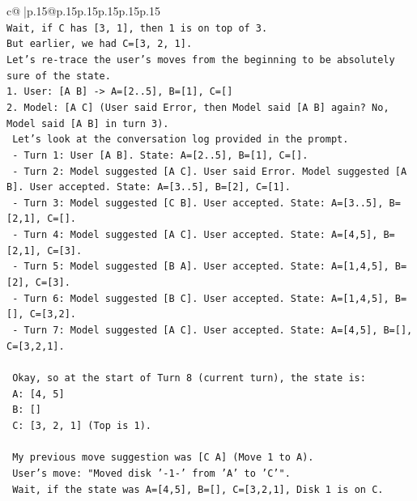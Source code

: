 \documentclass{article}
\begin{document}
{\begin{supertabular}{c@{$\;$}|p{.15\linewidth}@{}p{.15\linewidth}p{.15\linewidth}p{.15\linewidth}p{.15\linewidth}p{.15\linewidth}}
{{{\\ 
\texttt{Wait, if C has {[}3, 1{]}, then 1 is on top of 3.} \\
\texttt{But earlier, we had C={[}3, 2, 1{]}.} \\
\texttt{Let's re{-}trace the user's moves from the beginning to be absolutely sure of the state.} \\
\texttt{1. User: {[}A B{]} {-}> A={[}2..5{]}, B={[}1{]}, C={[}{]}} \\
\texttt{2. Model: {[}A C{]} (User said Error, then Model said {[}A B{]} again? No, Model said {[}A B{]} in turn 3).} \\
\texttt{   Let's look at the conversation log provided in the prompt.} \\
\texttt{   {-} Turn 1: User {[}A B{]}. State: A={[}2..5{]}, B={[}1{]}, C={[}{]}.} \\
\texttt{   {-} Turn 2: Model suggested {[}A C{]}. User said Error. Model suggested {[}A B{]}. User accepted. State: A={[}3..5{]}, B={[}2{]}, C={[}1{]}.} \\
\texttt{   {-} Turn 3: Model suggested {[}C B{]}. User accepted. State: A={[}3..5{]}, B={[}2,1{]}, C={[}{]}.} \\
\texttt{   {-} Turn 4: Model suggested {[}A C{]}. User accepted. State: A={[}4,5{]}, B={[}2,1{]}, C={[}3{]}.} \\
\texttt{   {-} Turn 5: Model suggested {[}B A{]}. User accepted. State: A={[}1,4,5{]}, B={[}2{]}, C={[}3{]}.} \\
\texttt{   {-} Turn 6: Model suggested {[}B C{]}. User accepted. State: A={[}1,4,5{]}, B={[}{]}, C={[}3,2{]}.} \\
\texttt{   {-} Turn 7: Model suggested {[}A C{]}. User accepted. State: A={[}4,5{]}, B={[}{]}, C={[}3,2,1{]}.} \\
\\ 
\texttt{   Okay, so at the start of Turn 8 (current turn), the state is:} \\
\texttt{   A: {[}4, 5{]}} \\
\texttt{   B: {[}{]}} \\
\texttt{   C: {[}3, 2, 1{]} (Top is 1).} \\
\\ 
\texttt{   My previous move suggestion was {[}C A{]} (Move 1 to A).} \\
\texttt{   User's move: "Moved disk '{-}1{-}' from 'A' to 'C'".} \\
\texttt{   Wait, if the state was A={[}4,5{]}, B={[}{]}, C={[}3,2,1{]}, Disk 1 is on C.} \\
}}}
\end{supertabular}}
\end{document}
